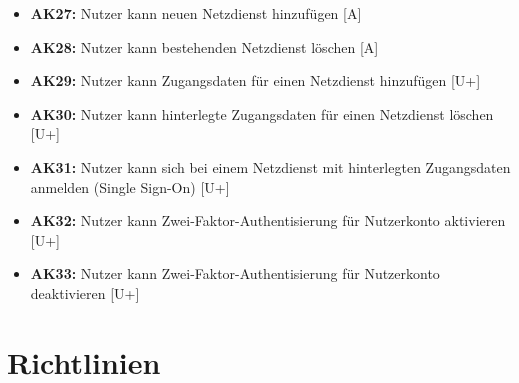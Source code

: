 \documentclass[fontsize=12pt,DIV=14,BCOR=10mm,a4paper,parskip=half-,headsepline,headinclude,english,ngerman,bibliography=totocnumbered]{scrreprt}
\begin{document}
\begin{itemize}
  \item \textbf{AK27:} Nutzer kann neuen Netzdienst hinzufügen [A]
  \item \textbf{AK28:} Nutzer kann bestehenden Netzdienst löschen [A]
  \item \textbf{AK29:} Nutzer kann Zugangsdaten für einen Netzdienst hinzufügen [U+]
  \item \textbf{AK30:} Nutzer kann hinterlegte Zugangsdaten für einen Netzdienst löschen [U+]
  \item \textbf{AK31:} Nutzer kann sich bei einem Netzdienst mit hinterlegten Zugangsdaten anmelden (Single Sign-On) [U+]

  \item \textbf{AK32:} Nutzer kann Zwei-Faktor-Authentisierung für Nutzerkonto aktivieren [U+]
  \item \textbf{AK33:} Nutzer kann Zwei-Faktor-Authentisierung für Nutzerkonto deaktivieren [U+]
\end{itemize}

\chapter{Richtlinien}
\end{document}

